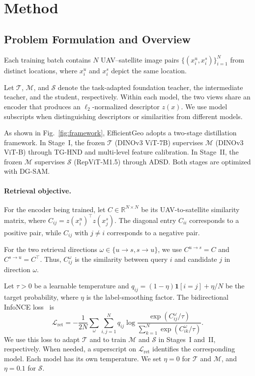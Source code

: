 \section{Method}
\label{sec:method}
\subsection{Problem Formulation and Overview}
\label{sec:overview}

Each training batch contains $N$ UAV--satellite image pairs
$\{(x_i^u,x_i^s)\}_{i=1}^{N}$ from distinct locations,
where $x_i^u$ and $x_i^s$ depict the same location.

Let $\mathcal{T}$, $\mathcal{M}$, and $\mathcal{S}$ denote
the task-adapted foundation teacher, the intermediate
teacher, and the student, respectively. Within each model,
the two views share an encoder that produces an
$\ell_2$-normalized descriptor $z(x)$. We use model
subscripts when distinguishing descriptors or similarities
from different models.

As shown in Fig.~\ref{fig:framework}, EfficientGeo adopts
a two-stage distillation framework. In Stage~I, the frozen
$\mathcal{T}$ (DINOv3 ViT-7B) supervises $\mathcal{M}$
(DINOv3 ViT-B) through TG-HND and multi-level feature
calibration. In Stage~II, the frozen $\mathcal{M}$
supervises $\mathcal{S}$ (RepViT-M1.5) through ADSD.
Both stages are optimized with DG-SAM.



\paragraph{Retrieval objective.}
For the encoder being trained, let
$C\in\mathbb{R}^{N\times N}$ be its UAV-to-satellite
similarity matrix, where
$C_{ij}=z(x_i^u)^\top z(x_j^s)$. The diagonal entry
$C_{ii}$ corresponds to a positive pair, while
$C_{ij}$ with $j\ne i$ corresponds to a negative pair.

For the two retrieval directions
$\omega\in\{u\rightarrow s,s\rightarrow u\}$, we use
$C^{u\rightarrow s}=C$ and
$C^{s\rightarrow u}=C^\top$. Thus, $C_{ij}^{\omega}$
is the similarity between query $i$ and candidate $j$
in direction $\omega$.

Let $\tau>0$ be a learnable temperature and
$q_{ij}=(1-\eta)\mathbf{1}[i=j]+\eta/N$ be the target
probability, where $\eta$ is the label-smoothing factor.
The bidirectional InfoNCE loss~\cite{deuser2023sample4geo}
is
\begin{equation}
\mathcal{L}_{\mathrm{ret}}
=-\frac{1}{2N}
\sum_{\omega}\sum_{i,j=1}^{N}
q_{ij}
\log
\frac{\exp(C_{ij}^{\omega}/\tau)}
{\sum_{k=1}^{N}\exp(C_{ik}^{\omega}/\tau)}.
\label{eq:retrieval}
\end{equation}
We use this loss to adapt $\mathcal{T}$ and to train
$\mathcal{M}$ and $\mathcal{S}$ in Stages~I and~II,
respectively. When needed, a superscript on
$\mathcal{L}_{\mathrm{ret}}$ identifies the corresponding
model. Each model has its own temperature. We set
$\eta=0$ for $\mathcal{T}$ and $\mathcal{M}$, and
$\eta=0.1$ for $\mathcal{S}$.

